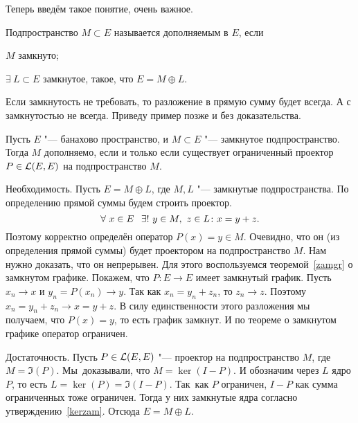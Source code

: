 Теперь введём такое понятие, очень важное.
\begin{Def}
Подпространство $M\subset E$ называется дополняемым в $E$, если 
\begin{roItems}
  \item $M$ замкнуто;
  \item $\exists\ L\subset E$ замкнутое, такое, что $E = M\oplus L$.
\end{roItems}
\end{Def}
Если замкнутость не требовать, то разложение в прямую сумму будет всегда. А с замкнутостью не всегда. Приведу пример позже и без доказательства.
\begin{The}
  Пусть $E$ "--- банахово пространство, и $M\subset E$ "--- замкнутое подпространство. Тогда $M$ дополняемо, если и только если существует ограниченный проектор $P\in\mathcal L(E,E)$ на подпространство $M$.
\end{The}
\begin{Proof}
  Необходимость. Пусть $E = M\oplus L$, где $M,L$ "--- замкнутые подпространства. По определению прямой суммы будем строить проектор.
\[
  \forall\ x\in E\pau \exists !\ y\in M,\ z\in L\colon x = y+ z.
\]
Поэтому корректно определён оператор $P(x) = y\in M$. Очевидно, что он (из определения прямой суммы) будет проектором на подпространство $M$. Нам нужно доказать, что он непрерывен. Для этого воспользуемся теоремой~\ref{zamgr} о замкнутом графике. Покажем, что $P\colon E\to E$ имеет замкнутый график. Пусть $x_n\to x$ и $y_n = P(x_n)\to y$. Так как $x_n = y_n + z_n$, то $z_n\to z$. Поэтому $x_n = y_n + z_n\to x = y+ z$. В силу единственности этого разложения мы получаем, что $P(x) = y$, то есть график замкнут. И по теореме о замкнутом графике оператор ограничен.

Достаточность. Пусть $P\in \mathcal L(E,E)$ "--- проектор на подпространство $M$, где $M = \Im(P)$. Мы~доказывали, что $M = \ker(I-P)$. И обозначим через $L$ ядро $P$, то есть 
$L = \ker(P) = \Im(I-P)$. Так~как $P$ ограничен, $I-P$ как сумма ограниченных тоже ограничен. Тогда у них замкнутые ядра согласно утверждению~\ref{kerzam}. Отсюда $E = M\oplus L$.
\end{Proof}


